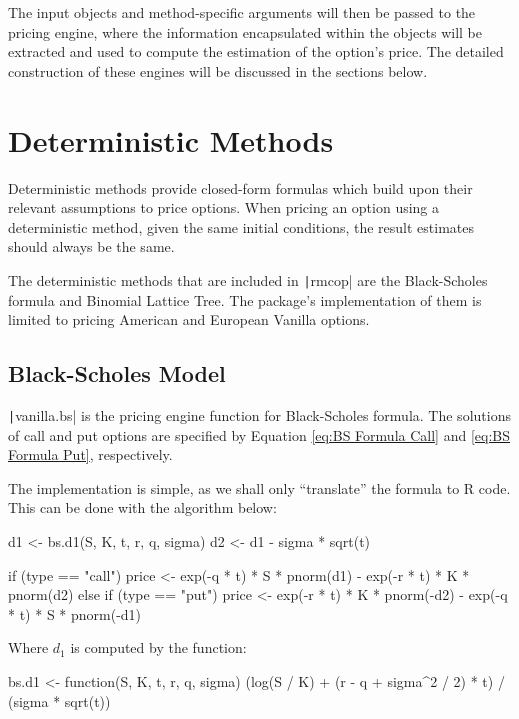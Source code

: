The input objects and method-specific arguments will then be passed to the pricing engine, where the information encapsulated within the objects will be extracted and used to compute the estimation of the option's price. The detailed construction of these engines will be discussed in the sections below.

\section{Deterministic Methods} \label{sec:det_dev}

Deterministic methods provide closed-form formulas which build upon their relevant assumptions to price options. When pricing an option using a deterministic method, given the same initial conditions, the result estimates should always be the same.

The deterministic methods that are included in \texttt|rmcop| are the Black-Scholes formula and Binomial Lattice Tree. The package's implementation of them is limited to pricing American and European Vanilla options.

\subsection{Black-Scholes Model}

\texttt|vanilla.bs| is the pricing engine function for Black-Scholes formula. The solutions of call and put options are specified by Equation \ref{eq:BS Formula Call} and \ref{eq:BS Formula Put}, respectively.

The implementation is simple, as we shall only ``translate'' the formula to R code. This can be done with the algorithm below:

\begin{Rminted}
d1 <- bs.d1(S, K, t, r, q, sigma)
d2 <- d1 - sigma * sqrt(t)

if (type == "call") {
    price <- exp(-q * t) * S * pnorm(d1) - exp(-r * t) * K * pnorm(d2)
} else if (type == "put") {
    price <- exp(-r * t) * K * pnorm(-d2) - exp(-q * t) * S * pnorm(-d1)
}
\end{Rminted}

Where $d_1$ is computed by the function:

\begin{Rminted}
bs.d1 <- function(S, K, t, r, q, sigma) {
    (log(S / K) + (r - q + sigma^2 / 2) * t) / (sigma * sqrt(t))
}
\end{Rminted}

